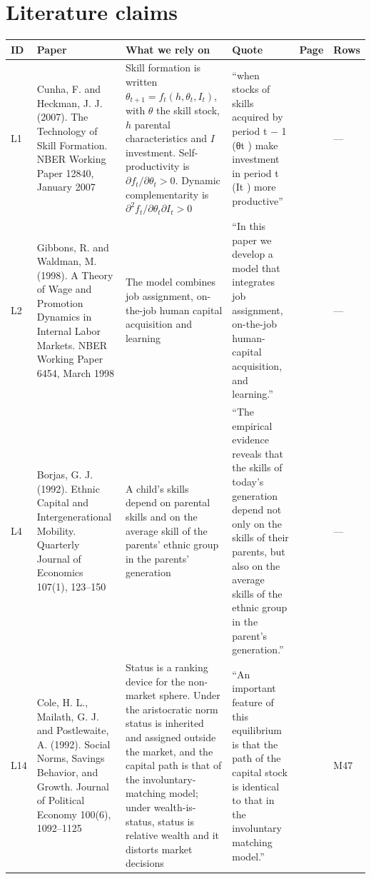 \documentclass[10pt]{article}
\begin{document}
\section{Literature claims}
{\small
\begin{longtable}{>{\raggedright\arraybackslash}p{0.8cm} >{\raggedright\arraybackslash}p{5.4cm} >{\raggedright\arraybackslash}p{5.6cm} >{\raggedright\arraybackslash}p{7.0cm} >{\raggedright\arraybackslash}p{1.2cm} >{\raggedright\arraybackslash}p{2.0cm}}
\toprule ID & Paper & What we rely on & Quote & Page & Rows \\ \midrule \endhead
L1 & Cunha, F. and Heckman, J. J. (2007). The Technology of Skill Formation. NBER Working Paper 12840, January 2007 & Skill formation is written $\theta_{t+1}=f_t(h,\theta_t,I_t)$, with $\theta$ the skill stock, $h$ parental characteristics and $I$ investment. Self-productivity is $\partial f_t/\partial\theta_t>0$. Dynamic complementarity is $\partial^2 f_t/\partial\theta_t\partial I_t>0$ & ``when stocks of skills acquired by period t − 1 (θt ) make investment in period t (It ) more productive'' & 9 & --- \\ \midrule
L2 & Gibbons, R. and Waldman, M. (1998). A Theory of Wage and Promotion Dynamics in Internal Labor Markets. NBER Working Paper 6454, March 1998 & The model combines job assignment, on-the-job human capital acquisition and learning & ``In this paper we develop a model that integrates job assignment, on-the-job human-capital acquisition, and learning.'' & 3 & --- \\ \midrule
L4 & Borjas, G. J. (1992). Ethnic Capital and Intergenerational Mobility. Quarterly Journal of Economics 107(1), 123--150 & A child's skills depend on parental skills and on the average skill of the parents' ethnic group in the parents' generation & ``The empirical evidence reveals that the skills of today's generation depend not only on the skills of their parents, but also on the average skills of the ethnic group in the parent's generation.'' & 123 & --- \\ \midrule
L14 & Cole, H. L., Mailath, G. J. and Postlewaite, A. (1992). Social Norms, Savings Behavior, and Growth. Journal of Political Economy 100(6), 1092--1125 & Status is a ranking device for the non-market sphere. Under the aristocratic norm status is inherited and assigned outside the market, and the capital path is that of the involuntary-matching model; under wealth-is-status, status is relative wealth and it distorts market decisions & ``An important feature of this equilibrium is that the path of the capital stock is identical to that in the involuntary matching model.'' & 1109 & M47 \\ \midrule

\end{longtable}}
\end{document}
